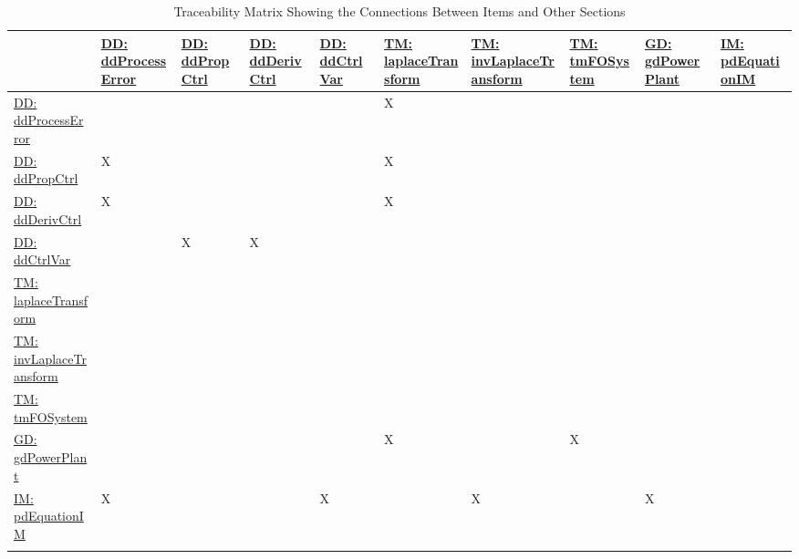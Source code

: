 \documentclass[12pt]{article}
\begin{document}
\begin{longtable}{l l l l l l l l l l}
\toprule
\textbf{} & \textbf{\hyperref[DD:ddProcessError]{DD: ddProcessError}} & \textbf{\hyperref[DD:ddPropCtrl]{DD: ddPropCtrl}} & \textbf{\hyperref[DD:ddDerivCtrl]{DD: ddDerivCtrl}} & \textbf{\hyperref[DD:ddCtrlVar]{DD: ddCtrlVar}} & \textbf{\hyperref[TM:laplaceTransform]{TM: laplaceTransform}} & \textbf{\hyperref[TM:invLaplaceTransform]{TM: invLaplaceTransform}} & \textbf{\hyperref[TM:tmFOSystem]{TM: tmFOSystem}} & \textbf{\hyperref[GD:gdPowerPlant]{GD: gdPowerPlant}} & \textbf{\hyperref[IM:pdEquationIM]{IM: pdEquationIM}}
\\
\midrule
\endhead
\hyperref[DD:ddProcessError]{DD: ddProcessError} &  &  &  &  & X &  &  &  & 
\\
\hyperref[DD:ddPropCtrl]{DD: ddPropCtrl} & X &  &  &  & X &  &  &  & 
\\
\hyperref[DD:ddDerivCtrl]{DD: ddDerivCtrl} & X &  &  &  & X &  &  &  & 
\\
\hyperref[DD:ddCtrlVar]{DD: ddCtrlVar} &  & X & X &  &  &  &  &  & 
\\
\hyperref[TM:laplaceTransform]{TM: laplaceTransform} &  &  &  &  &  &  &  &  & 
\\
\hyperref[TM:invLaplaceTransform]{TM: invLaplaceTransform} &  &  &  &  &  &  &  &  & 
\\
\hyperref[TM:tmFOSystem]{TM: tmFOSystem} &  &  &  &  &  &  &  &  & 
\\
\hyperref[GD:gdPowerPlant]{GD: gdPowerPlant} &  &  &  &  & X &  & X &  & 
\\
\hyperref[IM:pdEquationIM]{IM: pdEquationIM} & X &  &  & X &  & X &  & X & 
\\
\bottomrule
\caption{Traceability Matrix Showing the Connections Between Items and Other Sections}
\label{Table:TraceMatRefvsRef}
\end{longtable}
\end{document}
